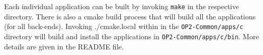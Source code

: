 \documentclass[11pt]{article}
\begin{document}
Each individual application can be built by invoking \texttt{make} in the respective directory. There is also a cmake
build process that will build all the applications (for all back-ends). Invoking  ./cmake.local within in the
\texttt{OP2-Common/apps/c} directory will build and install the applications in \texttt{OP2-Common/apps/c/bin}. More
details are given in the README file. 

\vspace{-10pt}
\small
\vspace{0pt}
 
\end{document}
